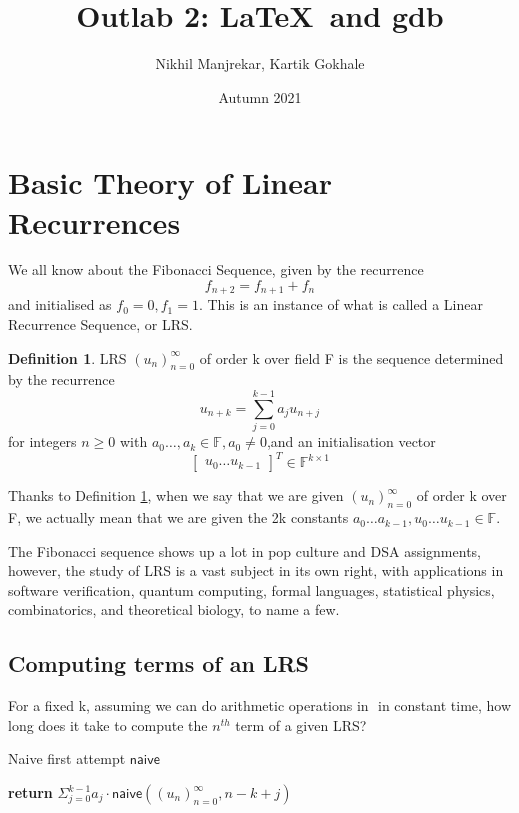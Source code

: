 \documentclass[answers]{exam}
\title{Outlab 2: \LaTeX\ and gdb}
\author{Nikhil Manjrekar, Kartik Gokhale}
\date{Autumn 2021}
\theoremstyle{definition}
\newtheorem{definition}{Definition}[section]
\newcommand{\term}[0]{(u_n)_{n=0}^\infty}
\begin{document}
\maketitle
\thispagestyle{empty}
\tableofcontents
\newpage
\clearpage
{} 
\section{Basic Theory of Linear Recurrences}
We all know about the Fibonacci Sequence, given by the recurrence
\[f_{n+2} = f_{n+1} + f_n\]
and initialised as $f_0 = 0, f_1 = 1$. This is an instance of what is called a Linear Recurrence Sequence, or LRS.
\begin{definition}\label{defn:one}
 LRS $(u_n)_{n=0}^\infty$ of order k over field F is the sequence determined by the recurrence \begin{equation}\label{eqn:one}u_{n+k}=\sum_{j=0}^{k-1}a_ju_{n+j}\end{equation} for integers $n\geq 0$ with $a_0\ldots ,a_k \in \mathbb{F}, a_0 \neq 0$,and an initialisation vector 
 \begin{equation}
     \begin{bmatrix}u_0 \ldots u_{k-1} \end{bmatrix}^T \in \mathbb{F}^{k\times 1}
\end{equation}
\end{definition}
\noindent Thanks to Definition \ref{defn:one}, when we say that we are given $\term$ of order k over F, we actually
mean that we are given the 2k constants $a_0 \ldots a_{k-1}, u_0 \ldots u_{k-1} \in \mathbb{F}$. 

The Fibonacci sequence shows up a lot in pop culture and DSA assignments, however, the study of LRS is a vast subject in its own right, with applications in software verification, quantum computing, formal languages, statistical physics, combinatorics, and theoretical biology, to name a few.
\subsection{Computing terms of an LRS}
For a fixed k, assuming we can do arithmetic operations in $\mathbb{}$ in constant time, how long does it take to compute the $n^{th}$ term of a given LRS?

\begin{algorithm}
\caption{Naive first attempt $\mathsf{naive}$}\label{alg:one}
\KwData{LRS $\term, n$}
\textbf{return} $\Sigma_{j=0}^{k-1}a_j\cdot\mathsf{naive}(\term,n-k+j)$
\end{algorithm}
\end{document}

